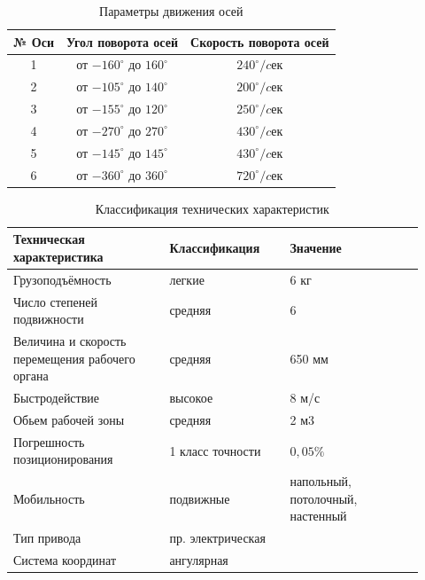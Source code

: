 \documentclass[a4paper,14pt,russian]{extreport} \usepackage{extsizes}
\begin{document}
	    \begin{table}[h!]
	    	\caption{Параметры движения осей} 
	    	\label{tab_kaw_joint}
	    	\centering
	    	\begin{tabular}{|c|c|c|}	
	    		\hline № Оси & Угол поворота осей & Скорость поворота осей  \\
	    		\hline 1 & 	от $-160^{\circ}$ до   $160^{\circ}$ & 	$240^{\circ}/cек$ \\
	    		\hline 2 & 	от $-105^{\circ}$ до   $140^{\circ}$  & 	$200^{\circ}/cек$ \\
	    		\hline 3 & 	от $-155^{\circ}$  до  $120^{\circ}$   & 	$250^{\circ}/cек$ \\
	    		\hline 4 & 	от $-270^{\circ}$  до  $270^{\circ}$   & 	$430^{\circ}/cек$ \\
	    		\hline 5 & 	от $-145^{\circ}$  до  $145^{\circ}$  & 	$430^{\circ}/cек $ \\
	    		\hline 6 & 	от $-360^{\circ}$  до  $360^{\circ}$  & $720^{\circ}/cек$ \\	    		
	    		\hline
	    	\end{tabular} 
	    \end{table}
	    \begin{table}[h!]
	    	\caption{Классификация технических характеристик} 
	    	\label{tab_kaw_klass2}
	    	\centering
	    	\begin{tabular}{|p{0.35\linewidth}|p{0.27\linewidth}|p{0.3\linewidth}|}	
	    		\hline Техническая характеристика & 	Классификация & 	Значение \\
	    		\hline Грузоподъёмность	 & легкие & 	6 кг \\
	    		\hline Число степеней подвижности & 	средняя & 	6 \\
	    		\hline Величина и скорость перемещения рабочего органа & 	средняя	 & 650 мм \\
	    		\hline Быстродействие & 	высокое & 	8 м/с \\
	    		\hline Обьем рабочей зоны	 & средняя & 	2 м3\\
	    		\hline Погрешность позиционирования & 	1 класс точности & 	$0,05\%$ \\
	    		\hline Мобильность & 	подвижные & напольный, потолочный, настенный \\
	    		\hline Тип привода &  пр.	электрическая &\\	
	    		\hline Система координат & 	ангулярная &	\\
	    		\hline
	    	\end{tabular} 
	    \end{table}
	\newpage
\end{document}
